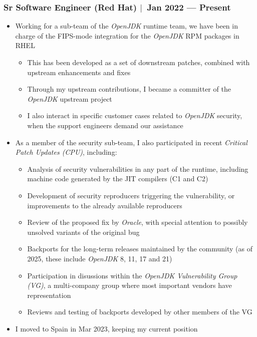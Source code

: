 \documentclass[12pt, a4paper]{article}
\newcommand{\mysep}{{\Large $\mid$}\ }
\begin{document}
    \subsubsection*{Sr Software Engineer (Red Hat) \mysep Jan 2022 --- Present}
    \begin{itemize}
        \item Working for a sub-team of the \emph{OpenJDK} runtime team,
        we have been in charge of the FIPS-mode integration
        for the \emph{OpenJDK} RPM packages in RHEL
        \begin{itemize}
            \item This has been developed as a set of downstream patches,
            combined with upstream enhancements and fixes
            \item Through my upstream contributions,
            I became a committer of the \emph{OpenJDK} upstream project
            \item I also interact in specific customer cases
            related to \emph{OpenJDK} security,
            when the support engineers demand our assistance
        \end{itemize}
        \item As a member of the security sub-team, I also participated in
        recent \emph{Critical Patch Updates (CPU)}, including:
        \begin{itemize}
            \item Analysis of security vulnerabilities in any part of the runtime,
            including machine code generated by the JIT compilers (C1 and C2)
            \item Development of security reproducers triggering the vulnerability,
            or improvements to the already available reproducers
            \item Review of the proposed fix by \emph{Oracle}, with special attention to
            possibly unsolved variants of the original bug
            \item Backports for the long-term releases maintained by the community
            (as of 2025, these include \emph{OpenJDK} 8, 11, 17 and 21)
            \item Participation in disussions within the \emph{OpenJDK Vulnerability Group (VG)},
            a multi-company group where most important vendors have representation
            \item Reviews and testing of backports developed by other members of the VG
        \end{itemize}
        \item I moved to Spain in Mar 2023, keeping my current position
    \end{itemize}
\end{document}
